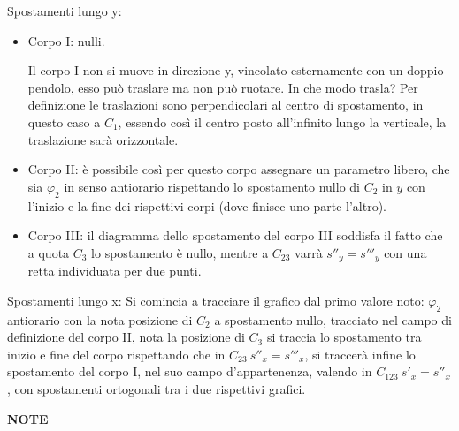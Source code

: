 \documentclass{article}
\begin{document}
\begin{adjustwidth}{2in}{}
Spostamenti lungo y: 
\begin{itemize}
	\item Corpo I: nulli. 
	
	Il corpo I non si muove in direzione y, vincolato esternamente con un doppio pendolo, esso può traslare ma non può ruotare. In che modo trasla? Per definizione le traslazioni sono perpendicolari al centro di spostamento, in questo caso a $C_1$, essendo così il centro posto all'infinito lungo la verticale, la traslazione sarà orizzontale. 
	\item Corpo II: è possibile così per questo corpo assegnare un parametro libero, che sia $\varphi_2$ in senso antiorario rispettando lo spostamento nullo di $C_2$ in $y$ con l'inizio e la fine dei rispettivi corpi (dove finisce uno parte l'altro). 
	\item Corpo III: il diagramma dello spostamento del corpo III soddisfa il fatto che a quota $C_3$ lo spostamento è nullo, mentre a $C_{23}$ varrà $s''_y = s'''_y$ con una retta individuata per due punti. 
\end{itemize} 

Spostamenti lungo x: \newline
Si comincia a tracciare il grafico dal primo valore noto: $\varphi_2$ antiorario con la nota posizione di $C_2$ a spostamento nullo, tracciato nel campo di definizione del corpo II, nota la posizione di $C_3$ si traccia lo spostamento tra inizio e fine del corpo rispettando che in $C_{23} ~ s''_x = s'''_x$, si traccerà infine lo spostamento del corpo I, nel suo campo d'appartenenza, valendo in $C_{123} ~ s'_x = s''_x$, con spostamenti ortogonali tra i due rispettivi grafici. 

\newpage
{\Large \textbf{NOTE}}





	
		
	\end{adjustwidth}
\end{document}
